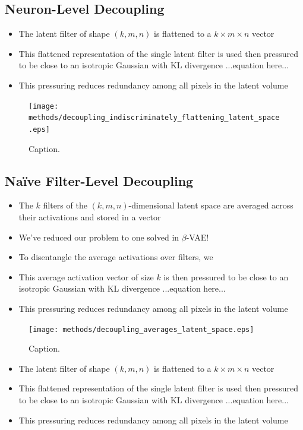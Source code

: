 %
%
\subsection{Neuron-Level Decoupling}
\begin{itemize}
\item The latent filter of shape $(k, m, n)$ is flattened to a $k \times m \times n$ vector
\item This flattened representation of the single latent filter is used then pressured to be close to an isotropic Gaussian with KL divergence ...equation here...
\item This pressuring reduces redundancy among all pixels in the latent volume
\end{itemize}

\begin{figure}[H]
\centering
\captionsetup{justification=centering}
\texttt{[image: methods/decoupling\_indiscriminately\_flattening\_latent\_space.eps]}
\caption{Caption.}
\label{fig:decoupling_indiscriminately_flattening_latent_space}
\end{figure}

%
%
\subsection{Na{\"i}ve Filter-Level Decoupling}
\begin{itemize}
\item The $k$ filters of the $(k, m, n)$-dimensional latent space are averaged across their activations and stored in a vector
\item We've reduced our problem to one solved in $\beta$-VAE!
\item To disentangle the average activations over filters, we 
\item This average activation vector of size $k$ is then pressured to be close to an isotropic Gaussian with KL divergence ...equation here...
\item This pressuring reduces redundancy among all pixels in the latent volume
\end{itemize}

\begin{figure}[H]
\centering
\captionsetup{justification=centering}
\texttt{[image: methods/decoupling\_averages\_latent\_space.eps]}
\caption{Caption.}
\label{fig:decoupling_averages_latent_space}
\end{figure}

\begin{itemize}
\item The latent filter of shape $(k, m, n)$ is flattened to a $k \times m \times n$ vector
\item This flattened representation of the single latent filter is used then pressured to be close to an isotropic Gaussian with KL divergence ...equation here...
\item This pressuring reduces redundancy among all pixels in the latent volume
\end{itemize}


